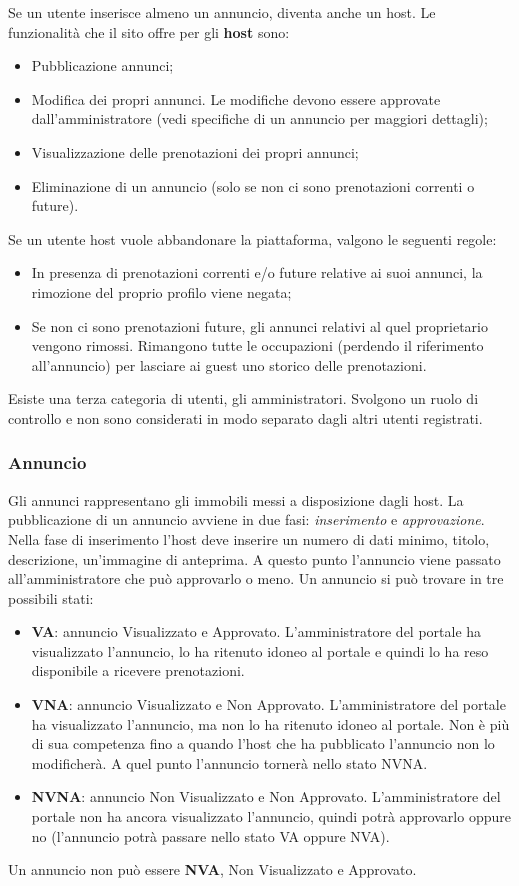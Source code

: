 \documentclass[1_relazione.tex]{subfiles}
\begin{document}
Se un utente inserisce almeno un annuncio, diventa anche un host. Le funzionalità che il sito offre per gli \textbf{host} sono: 
\begin{itemize}
\item Pubblicazione annunci;
\item Modifica dei propri annunci. Le modifiche devono essere approvate dall'amministratore (vedi specifiche di un annuncio per maggiori dettagli);
\item Visualizzazione delle prenotazioni dei propri annunci;
\item Eliminazione di un annuncio (solo se non ci sono prenotazioni correnti o future).
\end{itemize}
Se un utente host vuole abbandonare la piattaforma, valgono le seguenti regole:
\begin{itemize}
\item In presenza di prenotazioni correnti e/o future relative ai suoi annunci, la rimozione del proprio profilo viene negata;
\item Se non ci sono prenotazioni future, gli annunci relativi al quel proprietario vengono rimossi. Rimangono tutte le occupazioni (perdendo il riferimento all'annuncio) per lasciare ai guest uno storico delle prenotazioni.
\end{itemize}
Esiste una terza categoria di utenti, gli amministratori. Svolgono un ruolo di controllo e non sono considerati in modo separato dagli altri utenti registrati.  \\
\subsubsection{Annuncio} 
Gli annunci rappresentano gli immobili messi a disposizione dagli host. La pubblicazione di un annuncio avviene in due fasi: \textit{inserimento} e \textit{approvazione}.
Nella fase di inserimento l'host deve inserire un numero di dati minimo, titolo, descrizione, un'immagine di anteprima. A questo punto l'annuncio viene passato all'amministratore che può approvarlo o meno. Un annuncio si può trovare in tre possibili stati: 

\begin{itemize}
\item \textbf{VA}: annuncio Visualizzato e Approvato. L'amministratore del portale ha visualizzato l'annuncio, lo ha ritenuto idoneo al portale e quindi lo ha reso disponibile a ricevere prenotazioni.
\item \textbf{VNA}: annuncio Visualizzato e Non Approvato. L'amministratore del portale ha visualizzato l'annuncio, ma non lo ha ritenuto idoneo al portale. Non è più di sua competenza fino a quando l'host che ha pubblicato l'annuncio non lo modificherà. A quel punto l'annuncio tornerà nello stato NVNA.
\item \textbf{NVNA}: annuncio Non Visualizzato e Non Approvato. L'amministratore del portale non ha ancora visualizzato l'annuncio, quindi potrà approvarlo oppure no (l'annuncio potrà passare nello stato VA oppure NVA).
\end{itemize}
Un annuncio non può essere \textbf{NVA},  Non Visualizzato e Approvato. 
\end{document}
